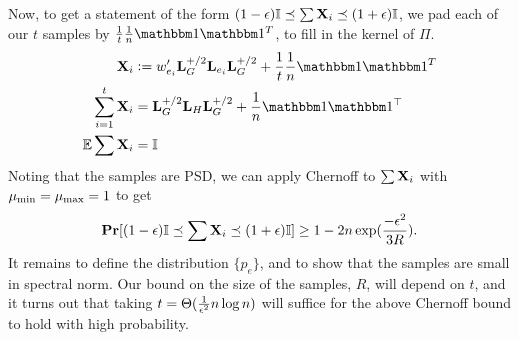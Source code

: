 \documentclass[11pt]{article}
\begin{document}
Now, to get a statement of the form $(1-\eps)\bb{I} \LE \sum \V{X}_i \LE
(1+\eps)\bb{I}$, we pad each of our $t$ samples by
$\frac{1}{t}\frac{1}{n}\ones\ones^T$, to fill in the kernel of $\Pi$.
\begin{align*}
\V{X}_i &:= w_{e_i}' \V{L}_G^\phalf \V{L}_{e_i} \V{L}_G^\phalf +
    \frac{1}{t}\frac{1}{n}\ones\ones^T \\
\sum_{i=1}^t \V{X}_i &= \V{L}_G^\phalf \V{L}_H \V{L}_G^\phalf + \frac{1}{n}\ones\ones^\T \\
\E \sum \V{X}_i &= \bb{I}
\end{align*}
Noting that the samples are PSD, we can apply Chernoff to $\sum \V{X}_i$ with $\mu_{\min}
= \mu_{\max} = 1$ to get \[\pr[(1-\eps)\bb{I} \LE \sum \V{X}_i \LE (1+\eps)\bb{I}] \ge 1 -
2n \exp(\frac{-\eps^2}{3R}).\] It remains to define the distribution $\{p_e\}$,
and to show that the samples are small in spectral norm. Our bound on the size
of the samples, $R$, will depend on $t$, and it turns out that taking $t =
\Theta(\frac{1}{\epsilon^2} n \log n)$ will suffice for the above Chernoff bound to
hold with high probability.
\end{document}
